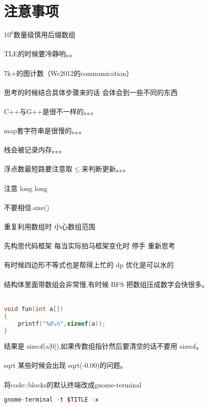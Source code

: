 \section{注意事项}
    $10^{6}$数量级慎用后缀数组\\
    \\
    TLE的时候要冷静哟。。\\
    \\
    7k+的图计数（Wc2012的communication）\\
    \\
    思考的时候结合具体步骤来的话 会体会到一些不同的东西\\
    \\
    C++与G++是很不一样的。。。\\
    \\
    map套字符串是很慢的。。。\\ 
    \\
    栈会被记录内存。。。\\
    \\
    浮点数最短路要注意取$\leq$来判断更新。。。\\
    \\
    注意 long long\\
    \\
    不要相信.size()\\
    \\
    重复利用数组时 小心数组范围\\
    \\
    先构思代码框架 每当实际拍马框架变化时 停手 重新思考\\
    \\
    有时候四边形不等式也是帮得上忙的 dp 优化是可以水的\\
    \\
    结构体里面带数组会非常慢,有时候 BFS 把数组压成数字会快很多。\\
    \\
    \begin{lstlisting}[language=c++]
void fun(int a[])
{
    printf("%d\n",sizeof(a));
}
    \end{lstlisting}
    结果是 sizeof(a[0]),如果传数组指针然后要清空的话不要用 sizeof。\\
    \\
    sqrt 某些时候会出现 sqrt(-0.00)的问题。\\
    \\
    将code::blocks的默认终端改成gnome-terminal
    \begin{lstlisting}[language=c++]
gnome-terminal -t $TITLE -x
    \end{lstlisting}